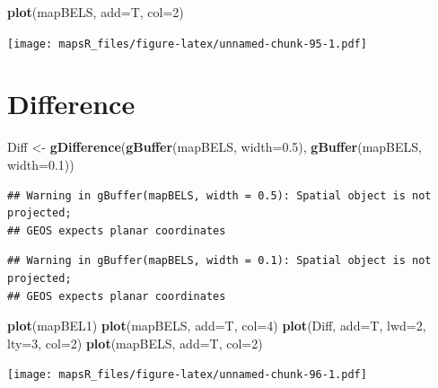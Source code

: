 \documentclass[]{report}
\newenvironment{Shaded}{\begin{snugshade}}{\end{snugshade}}
\newcommand{\KeywordTok}[1]{\textcolor[rgb]{0.13,0.29,0.53}{\textbf{{#1}}}}
\newcommand{\DataTypeTok}[1]{\textcolor[rgb]{0.13,0.29,0.53}{{#1}}}
\newcommand{\DecValTok}[1]{\textcolor[rgb]{0.00,0.00,0.81}{{#1}}}
\newcommand{\FloatTok}[1]{\textcolor[rgb]{0.00,0.00,0.81}{{#1}}}
\newcommand{\StringTok}[1]{\textcolor[rgb]{0.31,0.60,0.02}{{#1}}}
\newcommand{\NormalTok}[1]{{#1}}
\begin{document}
\begin{Shaded}
\begin{Highlighting}[]
\KeywordTok{plot}\NormalTok{(mapBELS, }\DataTypeTok{add=}\NormalTok{T, }\DataTypeTok{col=}\DecValTok{2}\NormalTok{)}
\end{Highlighting}
\end{Shaded}

\texttt{[image: mapsR\_files/figure-latex/unnamed-chunk-95-1.pdf]}

\section{Difference}\label{difference}

\begin{Shaded}
\begin{Highlighting}[]
\NormalTok{Diff <-}\StringTok{ }\KeywordTok{gDifference}\NormalTok{(}\KeywordTok{gBuffer}\NormalTok{(mapBELS, }\DataTypeTok{width=}\FloatTok{0.5}\NormalTok{), }\KeywordTok{gBuffer}\NormalTok{(mapBELS, }\DataTypeTok{width=}\FloatTok{0.1}\NormalTok{))}
\end{Highlighting}
\end{Shaded}

\begin{verbatim}
## Warning in gBuffer(mapBELS, width = 0.5): Spatial object is not projected;
## GEOS expects planar coordinates
\end{verbatim}

\begin{verbatim}
## Warning in gBuffer(mapBELS, width = 0.1): Spatial object is not projected;
## GEOS expects planar coordinates
\end{verbatim}

\begin{Shaded}
\begin{Highlighting}[]
\KeywordTok{plot}\NormalTok{(mapBEL1)}
\KeywordTok{plot}\NormalTok{(mapBELS, }\DataTypeTok{add=}\NormalTok{T, }\DataTypeTok{col=}\DecValTok{4}\NormalTok{)}
\KeywordTok{plot}\NormalTok{(Diff, }\DataTypeTok{add=}\NormalTok{T, }\DataTypeTok{lwd=}\DecValTok{2}\NormalTok{, }\DataTypeTok{lty=}\DecValTok{3}\NormalTok{, }\DataTypeTok{col=}\DecValTok{2}\NormalTok{)}
\KeywordTok{plot}\NormalTok{(mapBELS, }\DataTypeTok{add=}\NormalTok{T, }\DataTypeTok{col=}\DecValTok{2}\NormalTok{)}
\end{Highlighting}
\end{Shaded}

\texttt{[image: mapsR\_files/figure-latex/unnamed-chunk-96-1.pdf]}
\end{document}
